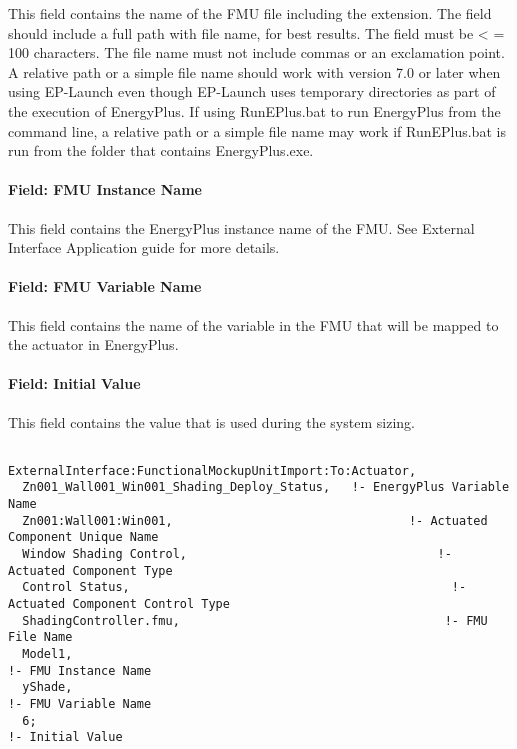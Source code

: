 This field contains the name of the FMU file including the extension. The field should include a full path with file name, for best results. The field must be \textless{} = 100 characters. The file name must not include commas or an exclamation point. A relative path or a simple file name should work with version 7.0 or later when using EP-Launch even though EP-Launch uses temporary directories as part of the execution of EnergyPlus. If using RunEPlus.bat to run EnergyPlus from the command line, a relative path or a simple file name may work if RunEPlus.bat is run from the folder that contains EnergyPlus.exe.

\paragraph{Field: FMU Instance Name}\label{field-fmu-instance-name-2}

This field contains the EnergyPlus instance name of the FMU. See External Interface Application guide for more details.

\paragraph{Field: FMU Variable Name}\label{field-fmu-variable-name-2}

This field contains the name of the variable in the FMU that will be mapped to the actuator in EnergyPlus.

\paragraph{Field: Initial Value}\label{field-initial-value-4}

This field contains the value that is used during the system sizing.

\begin{lstlisting}

ExternalInterface:FunctionalMockupUnitImport:To:Actuator,
  Zn001_Wall001_Win001_Shading_Deploy_Status,   !- EnergyPlus Variable Name
  Zn001:Wall001:Win001,                                 !- Actuated Component Unique Name
  Window Shading Control,                                   !- Actuated Component Type
  Control Status,                                             !- Actuated Component Control Type
  ShadingController.fmu,                                     !- FMU File Name
  Model1,                                                                   !- FMU Instance Name
  yShade,                                                                   !- FMU Variable Name
  6;                                                                             !- Initial Value
\end{lstlisting}


